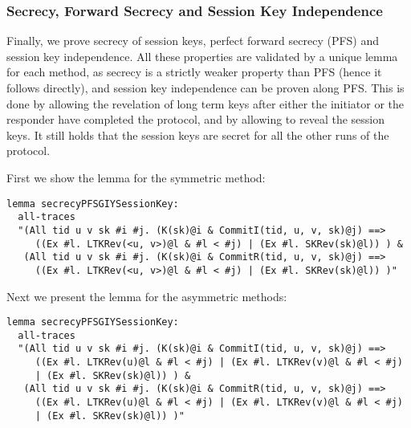 \subsubsection{Secrecy, Forward Secrecy and Session Key Independence}

Finally, we prove secrecy of session keys, perfect forward secrecy
(PFS) and session key independence. 
%
All these properties are validated by a unique lemma for each method,
as secrecy is a strictly weaker property than PFS (hence it follows
directly), and session key independence can be proven along PFS.
%
This is done by allowing the revelation of long term keys after either
the initiator or the responder have completed the protocol, and by
allowing to reveal the session keys.
%
It still holds that the session keys are secret for all the other runs
of the protocol.

First we show the lemma for the symmetric method:
\begin{lstlisting}
lemma secrecyPFSGIYSessionKey:
  all-traces
  "(All tid u v sk #i #j. (K(sk)@i & CommitI(tid, u, v, sk)@j) ==>
     ((Ex #l. LTKRev(<u, v>)@l & #l < #j) | (Ex #l. SKRev(sk)@l)) ) &
   (All tid u v sk #i #j. (K(sk)@i & CommitR(tid, u, v, sk)@j) ==>
     ((Ex #l. LTKRev(<u, v>)@l & #l < #j) | (Ex #l. SKRev(sk)@l)) )"
\end{lstlisting}

Next we present the lemma for the asymmetric methods:
\begin{lstlisting}
lemma secrecyPFSGIYSessionKey:
  all-traces
  "(All tid u v sk #i #j. (K(sk)@i & CommitI(tid, u, v, sk)@j) ==>
     ((Ex #l. LTKRev(u)@l & #l < #j) | (Ex #l. LTKRev(v)@l & #l < #j)
     | (Ex #l. SKRev(sk)@l)) ) &
   (All tid u v sk #i #j. (K(sk)@i & CommitR(tid, u, v, sk)@j) ==>
     ((Ex #l. LTKRev(u)@l & #l < #j) | (Ex #l. LTKRev(v)@l & #l < #j)
     | (Ex #l. SKRev(sk)@l)) )"
\end{lstlisting}






